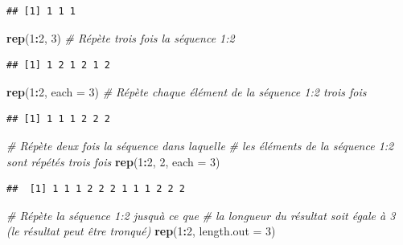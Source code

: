 \documentclass[
  11pt,
]{book}
\newenvironment{Shaded}{\begin{snugshade}}{\end{snugshade}}
\newcommand{\CommentTok}[1]{\textcolor[rgb]{0.56,0.35,0.01}{\textit{#1}}}
\newcommand{\DataTypeTok}[1]{\textcolor[rgb]{0.13,0.29,0.53}{#1}}
\newcommand{\DecValTok}[1]{\textcolor[rgb]{0.00,0.00,0.81}{#1}}
\newcommand{\KeywordTok}[1]{\textcolor[rgb]{0.13,0.29,0.53}{\textbf{#1}}}
\newcommand{\NormalTok}[1]{#1}
\newcommand{\OperatorTok}[1]{\textcolor[rgb]{0.81,0.36,0.00}{\textbf{#1}}}
\numberwithin{equation}{section}
\numberwithin{countremarque}{section}
\begin{document}
\begin{lstlisting}
## [1] 1 1 1
\end{lstlisting}

\begin{Shaded}
\begin{Highlighting}[]
\KeywordTok{rep}\NormalTok{(}\DecValTok{1}\OperatorTok{:}\DecValTok{2}\NormalTok{, }\DecValTok{3}\NormalTok{) }\CommentTok{\# Répète trois fois la séquence 1:2}
\end{Highlighting}
\end{Shaded}

\begin{lstlisting}
## [1] 1 2 1 2 1 2
\end{lstlisting}

\begin{Shaded}
\begin{Highlighting}[]
\KeywordTok{rep}\NormalTok{(}\DecValTok{1}\OperatorTok{:}\DecValTok{2}\NormalTok{, }\DataTypeTok{each =} \DecValTok{3}\NormalTok{) }\CommentTok{\# Répète chaque élément de la séquence 1:2 trois fois}
\end{Highlighting}
\end{Shaded}

\begin{lstlisting}
## [1] 1 1 1 2 2 2
\end{lstlisting}

\begin{Shaded}
\begin{Highlighting}[]
\CommentTok{\# Répète deux fois la séquence dans laquelle}
\CommentTok{\# les éléments de la séquence 1:2 sont répétés trois fois}
\KeywordTok{rep}\NormalTok{(}\DecValTok{1}\OperatorTok{:}\DecValTok{2}\NormalTok{, }\DecValTok{2}\NormalTok{, }\DataTypeTok{each =} \DecValTok{3}\NormalTok{)}
\end{Highlighting}
\end{Shaded}

\begin{lstlisting}
##  [1] 1 1 1 2 2 2 1 1 1 2 2 2
\end{lstlisting}

\begin{Shaded}
\begin{Highlighting}[]
\CommentTok{\# Répète la séquence 1:2 jusqu\textquotesingle{}à ce que}
\CommentTok{\# la longueur du résultat soit égale à 3 (le résultat peut être tronqué)}
\KeywordTok{rep}\NormalTok{(}\DecValTok{1}\OperatorTok{:}\DecValTok{2}\NormalTok{, }\DataTypeTok{length.out =} \DecValTok{3}\NormalTok{)}
\end{Highlighting}
\end{Shaded}
\end{document}
